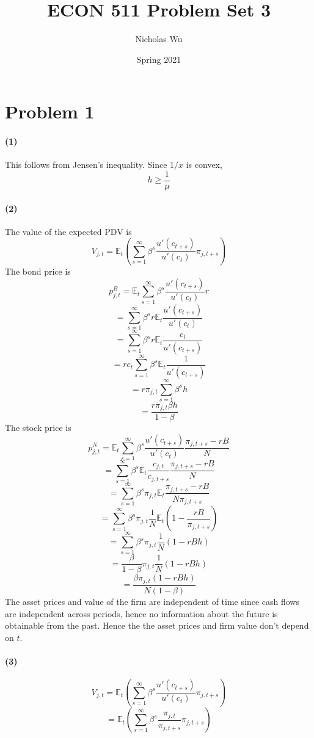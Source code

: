 \documentclass[10pt,letter]{article}
\newcommand{\problem}[1]{\section*{Problem #1}}
\newcommand{\problempart}[1]{\paragraph{#1}}
\begin{document}


\title{ECON 511 Problem Set 3}

\author{Nicholas Wu}

\date{Spring 2021}

\maketitle

\problem{1}
\problempart{(1)} This follows from Jensen's inequality. Since $1/x$ is convex,
\[ h \ge \frac{1}{\mu} \]
\problempart{(2)} The value of the expected PDV is
\[ V_{j,t} = \mathbb{E}_t \left( \sum_{s=1}^\infty \beta^s \frac{u'(c_{t+s})}{u'(c_t)}\pi_{j,t+s} \right) \]
The bond price is
\[ p^B_{j,t} = \mathbb{E}_t\sum_{s=1}^\infty \beta^s \frac{u'(c_{t+s})}{u'(c_t)} r \]
\[ = \sum_{s=1}^\infty \beta^s r \mathbb{E}_t \frac{u'(c_{t+s})}{u'(c_t)} \]
\[ = \sum_{s=1}^\infty \beta^s r \mathbb{E}_t \frac{c_t}{u'(c_{t+s})} \]
\[ = r c_t \sum_{s=1}^\infty \beta^s \mathbb{E}_t \frac{1}{u'(c_{t+s})} \]
\[ = r \pi_{j,t} \sum_{s=1}^\infty \beta^s h \]
\[ = \frac{r \pi_{j,t} \beta h}{1-\beta} \]
The stock price is
\[ p^N_{j,t} = \mathbb{E}_t\sum_{s=1}^\infty \beta^s \frac{u'(c_{t+s})}{u'(c_t)} \frac{\pi_{j,t+s} - rB}{N} \]
\[ = \sum_{s=1}^\infty \beta^s \mathbb{E}_t \frac{c_{j,t}}{c_{j,t+s}}\frac{\pi_{j,t+s} - rB}{N} \]
\[ = \sum_{s=1}^\infty \beta^s \pi_{j,t}\mathbb{E}_t \frac{\pi_{j,t+s} - rB}{N\pi_{j,t+s}}  \]
\[ = \sum_{s=1}^\infty \beta^s \pi_{j,t}\frac{1}{N}\mathbb{E}_t \left(1 - \frac{rB}{\pi_{j, t+s}} \right) \]
\[ = \sum_{s=1}^\infty \beta^s \pi_{j,t}\frac{1}{N} \left(1 - rBh \right) \]
\[ = \frac{\beta}{1-\beta} \pi_{j,t}\frac{1}{N} \left(1 - rBh \right) \]
\[ = \frac{\beta \pi_{j,t}\left(1 - rBh \right)}{N(1-\beta)}  \]
The asset prices and value of the firm are independent of time since cash flows are independent across periods, hence no information about the future is obtainable from the past. Hence the the asset prices and firm value don't depend on $t$.
\problempart{(3)}
\[ V_{j,t} = \mathbb{E}_t \left( \sum_{s=1}^\infty \beta^s \frac{u'(c_{t+s})}{u'(c_t)}\pi_{j,t+s} \right) \]
\[  = \mathbb{E}_t \left( \sum_{s=1}^\infty \beta^s \frac{\pi_{j,t}}{\pi_{j,t+s}}\pi_{j,t+s} \right) \]
\end{document}
